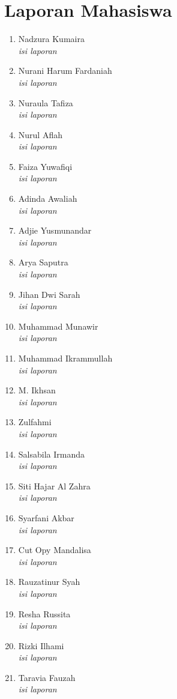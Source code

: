 \documentclass[a4paper]{tufte-handout}
\begin{document}
\section{Laporan Mahasiswa}
\begin{enumerate}
\item Nadzura Kumaira		\\
\textit{isi laporan}
\item Nurani Harum Fardaniah\\
\textit{isi laporan}
\item Nuraula Tafiza		\\
\textit{isi laporan}
\item Nurul Aflah			\\
\textit{isi laporan}
\item Faiza Yuwafiqi		\\
\textit{isi laporan}
\item Adinda Awaliah		\\
\textit{isi laporan}
\item Adjie Yusmunandar		\\
\textit{isi laporan}
\item Arya Saputra			\\
\textit{isi laporan}
\item Jihan Dwi Sarah		\\
\textit{isi laporan}
\item Muhammad Munawir		\\
\textit{isi laporan}
\item Muhammad Ikrammullah	\\
\textit{isi laporan}
\item M. Ikhsan				\\
\textit{isi laporan}
\item Zulfahmi				\\
\textit{isi laporan}
\item Salsabila Irmanda		\\
\textit{isi laporan}
\item Siti Hajar Al Zahra	\\
\textit{isi laporan}
\item Syarfani Akbar		\\
\textit{isi laporan}
\item Cut Opy Mandalisa		\\
\textit{isi laporan}
\item Rauzatinur Syah		\\
\textit{isi laporan}
\item Resha Russita			\\
\textit{isi laporan}
\item Rizki Ilhami			\\
\textit{isi laporan}
\item Taravia Fauzah		\\
\textit{isi laporan}
\end{enumerate}


\hrulefill

\newpage


\end{document}
